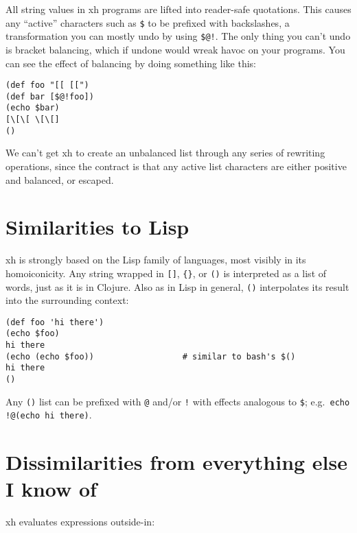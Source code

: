 \documentclass{report}
\begin{document}
  All string values in xh programs are lifted into reader-safe quotations. This
  causes any ``active'' characters such as \verb|$| to be prefixed with
  backslashes, a transformation you can mostly undo by using \verb|$@!|. The
  only thing you can't undo is bracket balancing, which if undone would wreak
  havoc on your programs. You can see the effect of balancing by doing
  something like this:

\begin{verbatim}
(def foo "[[ [[")
(def bar [$@!foo])
(echo $bar)
[\[\[ \[\[]
()
\end{verbatim}

  We can't get xh to create an unbalanced list through any series of rewriting
  operations, since the contract is that any active list characters are either
  positive and balanced, or escaped.

\chapter{Similarities to Lisp}\label{chp:similarities-to-lisp}
  xh is strongly based on the Lisp family of languages, most visibly in its
  homoiconicity. Any string wrapped in \verb|[]|, \verb|{}|, or \verb|()| is
  interpreted as a list of words, just as it is in Clojure. Also as in Lisp in
  general, \verb|()| interpolates its result into the surrounding context:

\begin{verbatim}
(def foo 'hi there')
(echo $foo)
hi there
(echo (echo $foo))                  # similar to bash's $()
hi there
()
\end{verbatim}

  Any \verb|()| list can be prefixed with \verb|@| and/or \verb|!| with effects
  analogous to \verb|$|; e.g.~\verb|echo !@(echo hi there)|.

\chapter{Dissimilarities from everything else I know of}\label{chp:dissimilarities}
  xh evaluates expressions outside-in:
\end{document}
